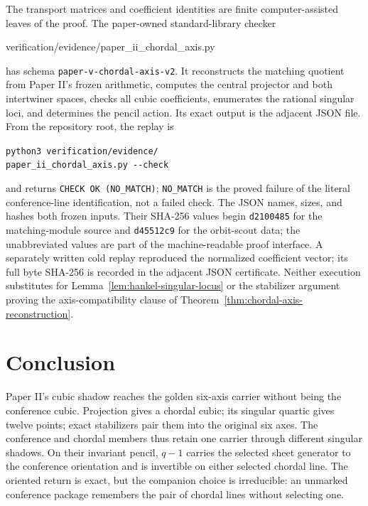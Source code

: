 \documentclass[11pt]{article}
\theoremstyle{definition}
\theoremstyle{remark}
\begin{document}
The transport matrices and coefficient identities are finite
computer-assisted leaves of the proof.  The paper-owned standard-library
checker
\begin{center}
\small\ttfamily
verification/evidence/paper\_ii\_chordal\_axis.py
\end{center}
has schema \texttt{paper-v-chordal-axis-v2}.  It reconstructs the matching
quotient from Paper II's frozen arithmetic, computes the central projector
and both intertwiner spaces, checks all cubic coefficients, enumerates the
rational singular loci, and determines the pencil action.  Its exact output
is the adjacent JSON file.  From the repository root, the replay is
\begin{center}
\small
\verb|python3 verification/evidence/|\\
\verb|paper_ii_chordal_axis.py --check|
\end{center}
and returns \texttt{CHECK OK (NO\_MATCH)}; \texttt{NO\_MATCH} is the proved
failure of the literal conference-line identification, not a failed check.
The JSON names, sizes, and hashes both frozen inputs.  Their SHA-256 values
begin \texttt{d2100485} for the matching-module source and
\texttt{d45512c9} for the orbit-scout data; the unabbreviated values are part
of the machine-readable proof interface.
A separately written cold replay reproduced the normalized coefficient
vector; its full byte SHA-256 is recorded in the adjacent JSON certificate.
Neither execution substitutes for Lemma~\ref{lem:hankel-singular-locus} or
the stabilizer argument proving the axis-compatibility clause of
Theorem~\ref{thm:chordal-axis-reconstruction}.

\section{Conclusion}
\label{sec:conclusion}

Paper II's cubic shadow reaches the golden six-axis carrier without being
the conference cubic.  Projection gives a chordal cubic; its singular
quartic gives twelve points; exact stabilizers pair them into the original
six axes.  The conference and chordal members thus retain one carrier through
different singular shadows.  On their invariant pencil, \(q-1\) carries the
selected sheet generator to the conference orientation and is invertible on
either selected chordal line.  The oriented return is exact, but the
companion choice is irreducible: an unmarked conference package remembers
the pair of chordal lines without selecting one.
\end{document}
